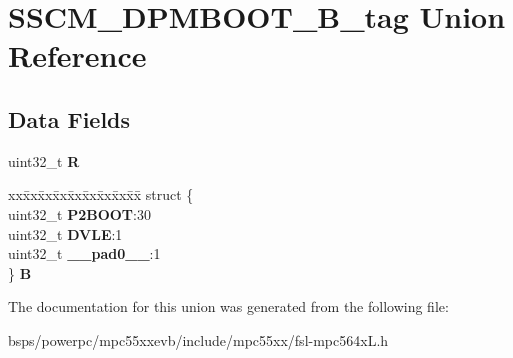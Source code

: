 \hypertarget{unionSSCM__DPMBOOT__32B__tag}{}\section{S\+S\+C\+M\+\_\+\+D\+P\+M\+B\+O\+O\+T\+\_\+B\+\_\+tag Union Reference}
\label{unionSSCM__DPMBOOT__32B__tag}
\subsection*{Data Fields}
\begin{DoxyCompactItemize}
\item 
\mbox{\label{unionSSCM__DPMBOOT__32B__tag_a60a6a1bd374a637af3e611674c756b9e}} 
uint32\+\_\+t {\bfseries R}
\item 
\mbox{\label{unionSSCM__DPMBOOT__32B__tag_adcbf95caccc4b5956ff7a2f3342da4ba}} 
\begin{tabbing}
xx\=xx\=xx\=xx\=xx\=xx\=xx\=xx\=xx\=\kill
struct \{\\
\>uint32\_t {\bfseries P2BOOT}:30\\
\>uint32\_t {\bfseries DVLE}:1\\
\>uint32\_t {\bfseries \_\_pad0\_\_}:1\\
\} {\bfseries B}\\

\end{tabbing}\end{DoxyCompactItemize}


The documentation for this union was generated from the following file\+:\begin{DoxyCompactItemize}
\item 
bsps/powerpc/mpc55xxevb/include/mpc55xx/fsl-\/mpc564x\+L.\+h\end{DoxyCompactItemize}
